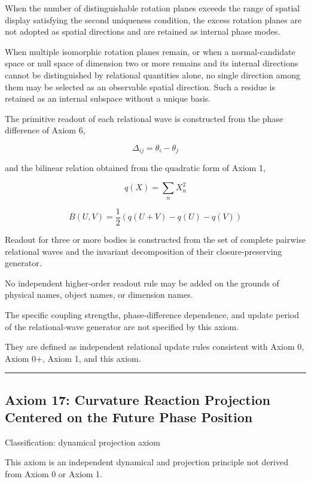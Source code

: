 \documentclass[
  a4paper,
]{article}
\begin{document}
When the number of distinguishable rotation planes exceeds the range of
spatial display satisfying the second uniqueness condition, the excess
rotation planes are not adopted as spatial directions and are retained
as internal phase modes.

When multiple isomorphic rotation planes remain, or when a
normal-candidate space or null space of dimension two or more remains
and its internal directions cannot be distinguished by relational
quantities alone, no single direction among them may be selected as an
observable spatial direction. Such a residue is retained as an internal
subspace without a unique basis.

The primitive readout of each relational wave is constructed from the
phase difference of Axiom 6,

\[
\Delta_{ij}=\theta_i-\theta_j
\]

and the bilinear relation obtained from the quadratic form of Axiom 1,

\[
q(X)=\sum_n X_n^2
\]

\[
B(U,V)
=\frac{1}{2}\left(q(U+V)-q(U)-q(V)\right)
\]

Readout for three or more bodies is constructed from the set of complete
pairwise relational waves and the invariant decomposition of their
closure-preserving generator.

No independent higher-order readout rule may be added on the grounds of
physical names, object names, or dimension names.

The specific coupling strengths, phase-difference dependence, and update
period of the relational-wave generator are not specified by this axiom.

They are defined as independent relational update rules consistent with
Axiom 0, Axiom 0+, Axiom 1, and this axiom.

\begin{center}\rule{0.5\linewidth}{0.5pt}\end{center}

\subsection{Axiom 17: Curvature Reaction Projection Centered on the
Future Phase
Position}\label{axiom-17-curvature-reaction-projection-centered-on-the-future-phase-position}

Classification: dynamical projection axiom

This axiom is an independent dynamical and projection principle not
derived from Axiom 0 or Axiom 1.
\end{document}
